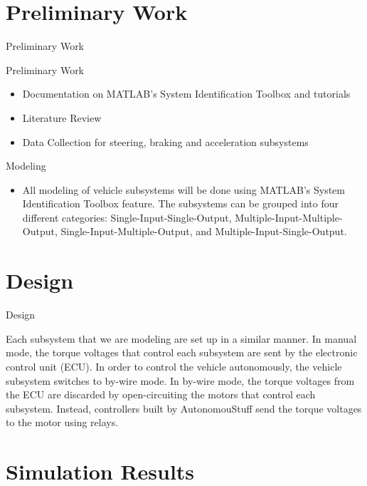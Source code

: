 \documentclass{beamer}
\begin{document}
\section{Preliminary Work}

\begin{frame}{Preliminary Work}
  \begin{block}{Preliminary Work}
 \begin{itemize}
        \item Documentation on MATLAB's System Identification Toolbox and tutorials
        \item Literature Review 
        \item Data Collection for steering, braking and acceleration subsystems
\end{itemize}
  \end{block}
  \begin {block}{Modeling}
  \begin{itemize}
  	\item All modeling of vehicle subsystems will be done using MATLAB's System Identification Toolbox feature. The subsystems can be grouped into four different categories: Single-Input-Single-Output, Multiple-Input-Multiple-Output, Single-Input-Multiple-Output, and Multiple-Input-Single-Output. 
  	\end{itemize}
  	\end{block}
\end{frame}

\section{Design}

\begin{frame}{Design}
	\begin{block}
		Each subsystem that we are modeling are set up in a similar manner. In manual mode, the torque voltages that control each subsystem are sent by the electronic control unit (ECU). In order to control the vehicle autonomously, the vehicle subsystem switches to by-wire mode. In by-wire mode, the torque voltages from the ECU are discarded by open-circuiting the motors that control each subsystem. Instead, controllers built by AutonomouStuff send the torque voltages to the motor using relays.
	\end{block}
\end{frame}

\section{Simulation Results}
\end{document}
